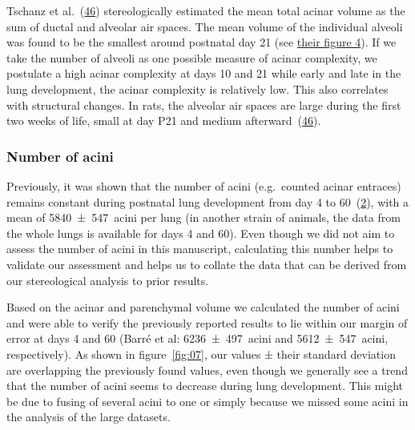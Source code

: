 \documentclass[
  american,
]{article}
\begin{document}
Tschanz et al.~(\protect\hyperlink{ref-wnl86DEM}{46}) stereologically estimated the mean total acinar volume as the sum of ductal and alveolar air spaces.
The mean volume of the individual alveoli was found to be the smallest around postnatal day 21 (see \href{https://www.physiology.org/na101/home/literatum/publisher/physio/journals/content/jappl/2014/jappl.2014.117.issue-1/japplphysiol.01355.2013/production/images/medium/zdg0121410620004.jpeg}{their figure 4}).
If we take the number of alveoli as one possible measure of acinar complexity, we postulate a high acinar complexity at days 10 and 21 while early and late in the lung development, the acinar complexity is relatively low.
This also correlates with structural changes.
In rats, the alveolar air spaces are large during the first two weeks of life, small at day P21 and medium afterward~(\protect\hyperlink{ref-wnl86DEM}{46}).

\hypertarget{number-of-acini-1}{%
\subsubsection{Number of acini}\label{number-of-acini-1}}

Previously, it was shown that the number of acini (e.g.~counted acinar entraces) remains constant during postnatal lung development from day 4 to 60~(\protect\hyperlink{ref-14OP85b2F}{2}), with a mean of 5840~±~547~acini per lung (in another strain of animals, the data from the whole lungs is available for days 4 and 60).
Even though we did not aim to assess the number of acini in this manuscript, calculating this number helps to validate our assessment and helps us to collate the data that can be derived from our stereological analysis to prior results.

Based on the acinar and parenchymal volume we calculated the number of acini and were able to verify the previously reported results to lie within our margin of error at days 4 and 60 (Barré et al: 6236~±~497~acini and 5612~±~547~acini, respectively).
As shown in figure~\ref{fig:07}, our values ± their standard deviation are overlapping the previously found values, even though we generally see a trend that the number of acini seems to decrease during lung development.
This might be due to fusing of several acini to one or simply because we missed some acini in the analysis of the large datasets.
\end{document}

